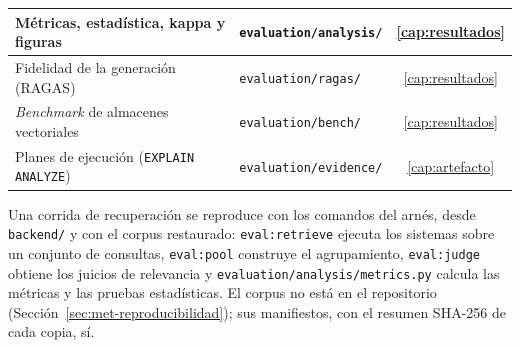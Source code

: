 \begin{table}[!htb]
\begin{tabular}{|p{5cm}|p{7.6cm}|c|}
        \hline
        Métricas, estadística, kappa y figuras & \texttt{evaluation/analysis/} & \ref{cap:resultados} \\
        \hline
        Fidelidad de la generación (RAGAS) & \texttt{evaluation/ragas/} & \ref{cap:resultados} \\
        \hline
        \textit{Benchmark} de almacenes vectoriales & \texttt{evaluation/bench/} & \ref{cap:resultados} \\
        \hline
        Planes de ejecución (\texttt{EXPLAIN ANALYZE}) & \texttt{evaluation/evidence/} & \ref{cap:artefacto} \\
        \hline
    \end{tabular}
\end{table}

Una corrida de recuperación se reproduce con los comandos del arnés, desde \texttt{backend/} y con el corpus restaurado: \texttt{eval:retrieve} ejecuta los sistemas sobre un conjunto de consultas, \texttt{eval:pool} construye el agrupamiento, \texttt{eval:judge} obtiene los juicios de relevancia y \texttt{evaluation/analysis/metrics.py} calcula las métricas y las pruebas estadísticas. El corpus no está en el repositorio (Sección~\ref{sec:met-reproducibilidad}); sus manifiestos, con el resumen SHA-256 de cada copia, sí.
